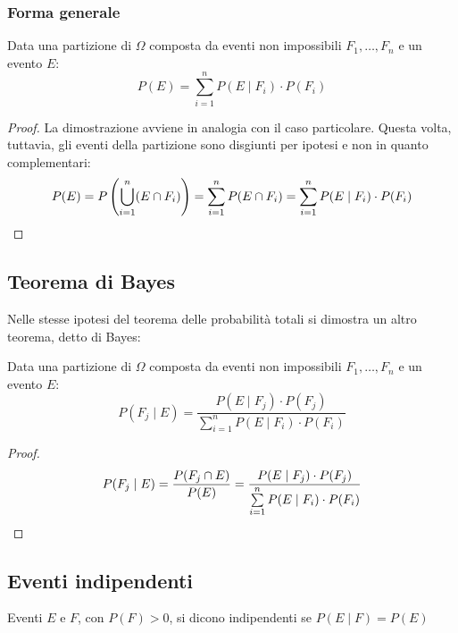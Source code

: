 \subsubsection{Forma generale}
\begin{teor}
	Data una partizione di $\Omega$ composta da eventi non impossibili $F_1,\dots, F_n$ e un evento $E$:
	\begin{equation*}
		P(E)= \sum_{i=1}^n P(E \mid F_i)\cdot P(F_i)
	\end{equation*}
\end{teor}
\begin{proof}
	La dimostrazione avviene in analogia con il caso particolare. Questa volta, tuttavia, gli eventi della partizione sono disgiunti per ipotesi e non in quanto complementari:
	\begin{equation*}
		P(E)=P \left(\bigcup_{i=1}^n (E\cap F_i) \right) = \sum_{i=1}^n P(E\cap F_i) = \sum_{i=1}^n P(E \mid F_i)\cdot P(F_i) \qedhere
	\end{equation*}
\end{proof}


\subsection{Teorema di Bayes}
Nelle stesse ipotesi del teorema delle probabilità totali si dimostra un altro teorema, detto di Bayes:
\begin{teor}[di Bayes]
	Data una partizione di $\Omega$ composta da eventi non impossibili $F_1,\dots, F_n$ e un evento $E$:
	\begin{equation*}
		P(F_j\mid E)=\frac{P(E\mid F_j)\cdot P(F_j)}{\sum\limits_{i=1}^n P(E \mid F_i)\cdot P(F_i)}
	\end{equation*}
\end{teor}

\begin{proof}
	\begin{equation*}
		P(F_j\mid E)=\frac{P(F_j \cap E)}{P(E)}=\frac{P(E\mid F_j)\cdot P(F_j)}{\sum\limits_{i=1}^n P(E \mid F_i)\cdot P(F_i)} \qedhere
	\end{equation*}
\end{proof}



\subsection{Eventi indipendenti}
\begin{defin}
	Eventi $E$ e $F$, con $P(F)>0$, si dicono indipendenti se $P(E \mid F)=P(E)$
\end{defin}

